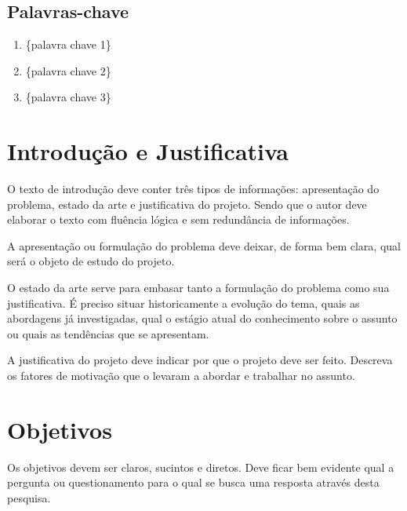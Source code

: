 \documentclass[
	12pt,				%
	a4paper,			%
	english,			%
	brazil,				%
	]{article}
\begin{document}
    	
    \subsection{Palavras-chave}

        \begin{enumerate}
        	\item \{palavra chave 1\}
        	\item \{palavra chave 2\}
        	\item \{palavra chave 3\}
        \end{enumerate}



\section{Introdução e Justificativa}

O texto de introdução deve conter três tipos de informações: apresentação do problema, estado da arte e justificativa do projeto.  Sendo que o autor deve elaborar
o texto com fluência lógica e sem redundância de informações. 

A apresentação ou formulação do problema deve deixar, de forma bem clara, qual será o objeto de estudo do projeto.

O estado da arte serve para embasar tanto a formulação do problema como sua justificativa. É preciso situar historicamente a evolução do tema, 
quais as abordagens já investigadas, qual o estágio atual do conhecimento sobre o assunto ou quais as tendências que se apresentam.

A justificativa do projeto deve indicar por que o projeto deve ser feito. Descreva os fatores de motivação que o levaram a abordar e trabalhar no assunto.


\section{Objetivos}


Os objetivos devem ser claros, sucintos e diretos. Deve ficar bem evidente qual a pergunta ou questionamento para o qual se busca uma resposta através desta pesquisa. 
\end{document}

